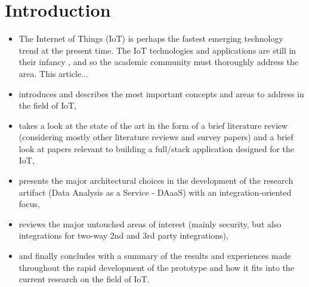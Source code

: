 \section{Introduction}

\begin{itemize}
    \item The Internet of Things (IoT) is perhaps the fastest emerging technology trend at the present time. The IoT technologies and applications are still in their infancy \autocite{xu:internetofthingsasurvey}, and so the academic community must thoroughly address the area. This article...
    \item introduces and describes the most important concepts and areas to address in the field of IoT,
    \item takes a look at the state of the art in the form of a brief literature review (considering mostly other literature reviews and survey papers) and a brief look at papers relevant to building a full/stack application designed for the IoT,
    \item presents the major architectural choices in the development of the research artifact (Data Analysis as a Service - DAaaS) with an integration-oriented focus,
    \item reviews the major untouched areas of interest (mainly security, but also integrations for two-way 2nd and 3rd party integrations),
    \item and finally concludes with a summary of the results and experiences made throughout the rapid development of the prototype and how it fits into the current research on the field of IoT.
\end{itemize}
